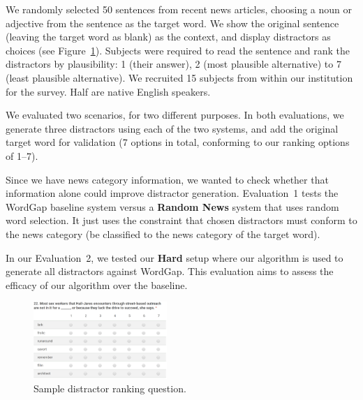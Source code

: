 We randomly selected 50 sentences from recent news articles, choosing
a noun or adjective from the sentence as the target word. We show the
original sentence (leaving the target word as blank) as the context,
and display distractors as choices (see
Figure~\ref{fig:distractor_1}). Subjects were required to read the
sentence and rank the distractors by plausibility: 1 (their answer), 2
(most plausible alternative) to 7 (least plausible alternative).
We recruited 15 subjects from within our institution for the survey.
Half are native English speakers.  
 
We evaluated two scenarios, for two different purposes. In both
evaluations, we generate three distractors using each of the two systems,
and add the original target word for validation (7 options in total,
conforming to our ranking options of 1--7).

Since we have news category information, we wanted to check whether
that information alone could improve distractor generation.
Evaluation~1 tests the WordGap baseline system versus a {\bf Random News}
system that uses random word selection.  It just uses the constraint
that chosen distractors must conform to the news category (be
classified to the news category of the target word).

In our Evaluation~2, we tested our {\bf Hard} setup where our
algorithm is used to generate all distractors against WordGap.  This
evaluation aims to assess the efficacy of our algorithm over the
baseline.



\begin{figure}[th]
   \centering
   \includegraphics[width=0.45\textwidth]{distractor_new.png}
   \caption{Sample distractor ranking question.}
   \label{fig:distractor_1}
\end{figure}



